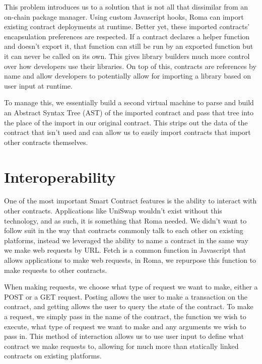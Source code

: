 \documentclass[a4paper]{article}
\begin{document}
This problem introduces us to a solution that is not all that dissimilar from an on-chain package manager. Using custom Javascript hooks, Roma can import existing contract deployments at runtime. Better yet, these imported contracts' encapsulation preferences are respected. If a contract declares a helper function and doesn't export it, that function can still be run by an exported function but it can never be called on its own. This gives library builders much more control over how developers use their libraries. On top of this, contracts are references by name and allow developers to potentially allow for importing a library based on user input at runtime.

To manage this, we essentially build a second virtual machine to parse and build an Abstract Syntax Tree (AST)\cite{ast} of the imported contract and pass that tree into the place of the import in our original contract. This strips out the data of the contract that isn't used and can allow us to easily import contracts that import other contracts themselves.

\section{Interoperability}
One of the most important Smart Contract features is the ability to interact with other contracts. Applications like UniSwap wouldn't exist without this technology, and as such, it is something that Roma needed. We didn't want to follow suit in the way that contracts commonly talk to each other on existing platforms, instead we leveraged the ability to name a contract in the same way we make web requests by URL. Fetch is a common function in Javascript that allows applications to make web requests, in Roma, we repurpose this function to make requests to other contracts. \cite{fetch}

When making requests, we choose what type of request we want to make, either a POST or a GET request. Posting allows the user to make a transaction on the contract, and getting allows the user to query the state of the contract. To make a request, we simply pass in the name of the contract, the function we wish to execute, what type of request we want to make and any arguments we wish to pass in. This method of interaction allows us to use user input to define what contract we make requests to, allowing for much more than statically linked contracts on existing platforms.
\end{document}
